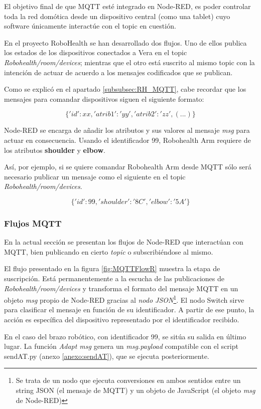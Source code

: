 El objetivo final de que MQTT esté integrado en Node-RED, es poder controlar toda la red domótica desde un dispositivo central (como una tablet) cuyo software únicamente interactúe con el topic en cuestión.

En el proyecto RoboHealth se han desarrollado dos flujos. Uno de ellos publica los estados de los dispositivos conectados a Vera en el topic \textit{Robohealth/room/devices}; mientras que el otro está suscrito al mismo topic con la intención de actuar de acuerdo a los mensajes codificados que se publican.

Como se explicó en el apartado \ref{subsubsec:RH_MQTT}, cabe recordar que los mensajes para comandar dispositivos siguen el siguiente formato:

$$\{'id':xx,'atrib1':'yy','atrib2':'zz',(...)\}$$

Node-RED se encarga de añadir los atributos y sus valores al mensaje \textit{msg} para actuar en consecuencia. Usando el identificador 99, Robohealth Arm requiere de los atributos \textbf{shoulder} y \textbf{elbow}.

Así, por ejemplo, si se quiere comandar Robohealth Arm desde MQTT sólo será necesario publicar un mensaje como el siguiente en el topic \textit{Robohealth/room/devices}.

$$\{'id':99,'shoulder':'8C','elbow':'5A'\}$$

\subsubsection{Flujos MQTT}

En la actual sección se presentan los flujos de Node-RED que interactúan con MQTT, bien publicando en cierto \textit{topic} o subscribiéndose al mismo.

El flujo presentado en la figura \ref{fig:MQTTFlowR} muestra la etapa de suscripción. Está permanentemente a la escucha de las publicaciones de \textit{Robohealth/room/devices} y transforma el formato del mensaje MQTT en un objeto \textit{msg} propio de Node-RED gracias al \textit{nodo JSON}\footnote{Se trata de un nodo que ejecuta conversiones en ambos sentidos entre un string JSON (el mensaje de MQTT) y un objeto de JavaScript (el objeto \textit{msg} de Node-RED)}. El nodo Switch sirve para clasificar el mensaje en función de su identificador. A partir de ese punto, la acción es específica del dispositivo representado por el identificador recibido.

En el caso del brazo robótico, con identificador 99, se sitúa su salida en último lugar. La función \textit{Adapt msg} genera un \textit{msg.payload} compatible con el script sendAT.py (anexo \ref{anexo:sendAT}), que se ejecuta posteriormente.

